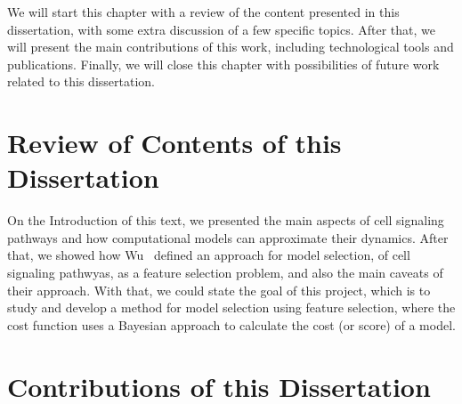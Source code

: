 We will start this chapter with a review of the content presented in 
this dissertation, with some extra discussion of a few specific topics.
After that, we will present the main contributions of this work,
including technological tools and publications. Finally, we will close
this chapter with possibilities of future work related to this
dissertation.


\section{Review of Contents of this Dissertation}
On the Introduction of this text, we presented the main aspects of cell
signaling pathways and how computational models can approximate their
dynamics. After that, we showed how Wu~\cite{Wu15} defined an approach
for model selection, of cell signaling pathwyas, as a feature selection
problem, and also the main caveats of their approach. With that, we
could state the goal of this project, which is to study and develop a
method for model selection using feature selection, where the cost 
function uses a Bayesian approach to calculate the cost (or score) of a
model.









\section{Contributions of this Dissertation}

